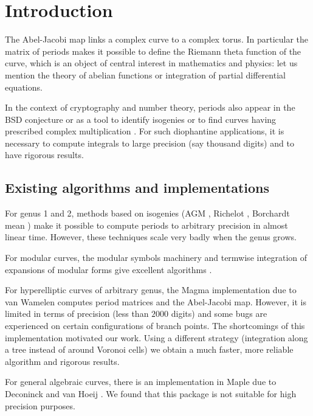 \documentclass[main.tex]{subfiles}
\begin{document}
  \section{Introduction}

  The Abel-Jacobi map links a complex curve to a complex torus.
  In particular the matrix of periods makes it possible to define the Riemann
  theta function of the curve, which is an object of central interest in
  mathematics and physics: let us
  mention the theory of abelian functions or integration of partial differential
  equations.

  In the context of cryptography and number theory, periods also appear
  in the BSD conjecture or as a tool to identify isogenies or to find
  curves having prescribed complex multiplication \cite{vanWamelen06}.
  For such diophantine applications, it is necessary to compute
  integrals to large precision (say thousand digits) and to have
  rigorous results.

  \subsection{Existing algorithms and implementations}

  For genus 1 and 2, methods based on isogenies (AGM \cite{CremonaAGM13},
  Richelot \cite{BostMestre88}, Borchardt mean \cite{Labrande16})
  make it possible to compute periods to arbitrary precision in almost
  linear time. However, these techniques scale very badly when the genus grows.

  For modular curves, the modular symbols machinery and termwise integration of
  expansions of modular forms give excellent algorithms
  \cite[\S 3.2]{Mascot13}.

  For hyperelliptic curves of arbitrary genus, the Magma implementation
  due to van Wamelen \cite{vanWamelen06} computes period matrices and the Abel-Jacobi map.
  However, it is limited in terms of precision (less
  than $2000$ digits) and some bugs are experienced on
  certain configurations of branch points. The shortcomings of this implementation motivated our
  work. Using a different strategy
  (integration along a tree instead of around Voronoi cells)
  we obtain a much faster, more reliable algorithm and rigorous results.

  For general algebraic curves, there is an implementation in Maple
  due to Deconinck and van Hoeij \cite{DeconinckvanHoeij01}.
  We found that this package is not suitable for high precision purposes.
\end{document}

